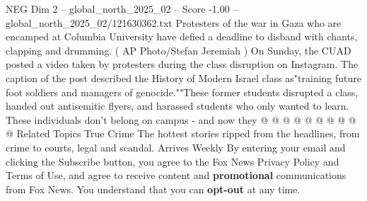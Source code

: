 \begin{textsample}{NEG Dim 2 – global\_north\_2025\_02 – Score -1.00 – global\_north\_2025\_02/121630362.txt}
Protesters of the war in Gaza who are encamped at Columbia University have defied a deadline to disband with chants, clapping and drumming. ( AP Photo/Stefan Jeremiah ) On Sunday, the CUAD posted a video taken by protesters during the class disruption on Instagram.
The caption of the post described the History of Modern Israel class as"training future foot soldiers and managers of genocide.""These former students disrupted a class, handed out antisemitic flyers, and harassed students who only wanted to learn.
These individuals don't belong on campus - and now they @ @ @ @ @ @ @ @ @ @ Related Topics True Crime The hottest stories ripped from the headlines, from crime to courts, legal and scandal.
Arrives Weekly By entering your email and clicking the Subscribe button, you agree to the Fox News Privacy Policy and Terms of Use, and agree to receive content and \textbf{promotional} communications from Fox News.
You understand that you can \textbf{opt-out} at any time.

\end{textsample}

